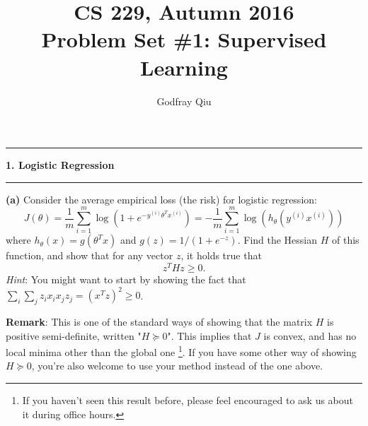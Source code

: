 \documentclass[11pt]{article}
\newcommand\question[2]{\vspace{.25in}\hrule\textbf{#1. #2}\vspace{.5em}\hrule\vspace{.10in}}
\renewcommand\part[1]{\vspace{.10in}\textbf{(#1)  }}
\begin{document}
\newcommand\NAME{Godfray Qiu}     %
\newcommand\STUID{}               %
\newcommand\HWNUM{1}              %



\title{\bfseries \sffamily CS 229, Autumn 2016\\Problem Set \#\HWNUM: Supervised Learning}
\author{\sffamily \NAME}

\maketitle


\question{1}{Logistic Regression}
\part{a}Consider the average empirical loss (the risk) for logistic regression:$$J(\theta) = \frac{1}{m}\sum_{i=1}^{m}\log(1+e^{-y^{(i)}\theta^Tx^{(i)}}) = -\frac{1}{m}\sum_{i=1}^{m}\log (h_{\theta}(y^{(i)}x^{(i)}))$$
where $h_{\theta}(x) = g(\theta^Tx)$ and $g(z) = 1/(1 + e^{-z})$. Find the Hessian $H$ of this function, and
show that for any vector $z$, it holds true that$$z^THz \geq 0.$$
\emph{Hint}: You might want to start by showing the fact that $\sum_{i}\sum_{j} z_ix_ix_jz_j = (x^Tz)^2 \geq 0$.

\textbf{Remark}: This is one of the standard ways of showing that the matrix $H$ is positive semi-definite, written "$H \succeq 0$". This implies that $J$ is convex, and has no local minima other than the global one \footnote{If you haven't seen this result before, please feel encouraged to ask us about it during office hours.}. If you have some other way of showing $H \succeq 0$, you're also welcome to use your method instead of the one above.
\end{document}
